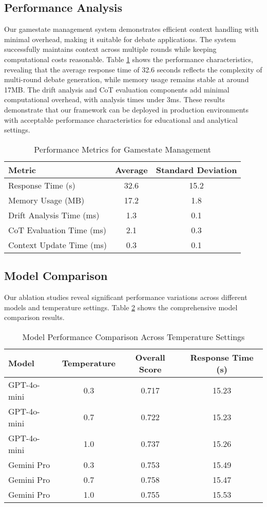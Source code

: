 \documentclass[11pt]{article}
\begin{document}
\subsection{Performance Analysis}

Our gamestate management system demonstrates efficient context handling with minimal overhead, making it suitable for debate applications. The system successfully maintains context across multiple rounds while keeping computational costs reasonable. Table \ref{tab:performance} shows the performance characteristics, revealing that the average response time of 32.6 seconds reflects the complexity of multi-round debate generation, while memory usage remains stable at around 17MB. The drift analysis and CoT evaluation components add minimal computational overhead, with analysis times under 3ms. These results demonstrate that our framework can be deployed in production environments with acceptable performance characteristics for educational and analytical settings.

\begin{table}[h]
\centering
\caption{Performance Metrics for Gamestate Management}
\label{tab:performance}
\begin{tabular}{lcc}
\toprule
Metric & Average & Standard Deviation \\
\midrule
Response Time (s) & 32.6 & 15.2 \\
Memory Usage (MB) & 17.2 & 1.8 \\
Drift Analysis Time (ms) & 1.3 & 0.1 \\
CoT Evaluation Time (ms) & 2.1 & 0.3 \\
Context Update Time (ms) & 0.3 & 0.1 \\
\bottomrule
\end{tabular}
\end{table}

\subsection{Model Comparison}

Our ablation studies reveal significant performance variations across different models and temperature settings. Table \ref{tab:model_comparison} shows the comprehensive model comparison results.

\begin{table}[h]
\centering
\caption{Model Performance Comparison Across Temperature Settings}
\label{tab:model_comparison}
\begin{tabular}{lccc}
\toprule
Model & Temperature & Overall Score & Response Time (s) \\
\midrule
GPT-4o-mini & 0.3 & 0.717 & 15.23 \\
GPT-4o-mini & 0.7 & 0.722 & 15.23 \\
GPT-4o-mini & 1.0 & 0.737 & 15.26 \\
Gemini Pro & 0.3 & 0.753 & 15.49 \\
Gemini Pro & 0.7 & 0.758 & 15.47 \\
Gemini Pro & 1.0 & 0.755 & 15.53 \\
\bottomrule
\end{tabular}
\end{table}
\end{document}
